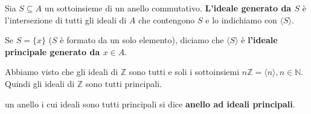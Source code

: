 \documentclass[../main.tex]{subfiles}
\begin{document}
\begin{definition}
    Sia $S \subseteq A$ un sottoinsieme di un anello commutativo. \textbf{L'ideale generato da $S$} è l'intersezione di tutti gli ideali di $A$ che contengono $S$ e lo indichiamo con $\langle S \rangle$.

    Se $S =\{x\}$ ($S$ è formato da un solo elemento), diciamo che $\langle S \rangle$ è \textbf{l'ideale principale generato da $x \in A$}.
\end{definition}

\begin{example}
    Abbiamo visto che gli ideali di $\mathbb{Z} $ sono tutti e soli i sottoinsiemi $n \mathbb{Z}  = \langle n \rangle, n \in \mathbb{N} $.
    Quindi gli ideali di $\mathbb{Z} $ sono tutti principali.
\end{example}

\begin{definition}
    un anello i cui ideali sono tutti principali si dice \textbf{anello ad ideali principali}.
\end{definition}
\end{document}
